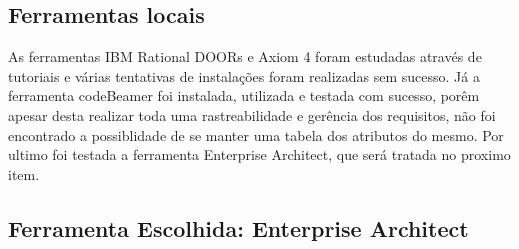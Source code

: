 	\subsection{Ferramentas locais}
		As ferramentas IBM Rational DOORs e Axiom 4 foram estudadas através de tutoriais e várias tentativas de instalações foram realizadas sem sucesso. Já a ferramenta codeBeamer foi instalada, utilizada e testada com sucesso, porêm apesar desta realizar toda uma rastreabilidade e gerência dos requisitos, não foi encontrado a possiblidade de se manter uma tabela dos atributos do mesmo. Por ultimo foi testada a ferramenta Enterprise Architect, que será tratada no proximo item.

	\subsection{Ferramenta Escolhida: Enterprise Architect}